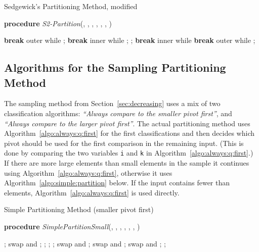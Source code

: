\documentclass[prodmode,acmtalg]{acmsmall}
\begin{document}
\begin{algorithm}
    \caption{Sedgewick's Partitioning Method, modified}\samepage\label{algo:sedgewick:partition:modified}
    \textbf{procedure} \textit{S2-Partition}(,
		, , ,
		, , )
    \begin{algorithmic}[1]
		  \State 
                  \State 
                  \If{}
                  \State \textbf{break} outer while
                  \EndIf
                  \If{} 
                \State ;
                 \ElsIf{}
                 \State \textbf{break} inner while
                 \EndIf
		 \State ;
		 \EndWhile
                 \State 
                 \If{}
                 \State ;
                 \ElsIf{} 
                 \State \textbf{break} inner while
                 \EndIf
                 \If{}
                 \State \textbf{break} outer while
                 \EndIf
		 \State ;
		 \EndWhile
                 \State 
		 \State 
		 \State 
		 \EndWhile
                 \State 
		 \State 
            \end{algorithmic}
            \end{algorithm}

\subsection{Algorithms for the Sampling Partitioning Method}\label{app:sec:our:algorithms}

The sampling method  from Section~\ref{sec:decreasing} uses a mix of two
classification algorithms: \emph{``Always compare to the smaller pivot first''},
and \emph{``Always compare to the larger pivot first''}.  
The actual partitioning method uses
Algorithm~\ref{algo:always:q:first} for the first 
classifications and then decides which pivot should be used for
the first comparison in the remaining input. (This is done by comparing the two variables \texttt{i} and
\texttt{k} in Algorithm~\ref{algo:always:q:first}.) If there are more large
elements than small elements in the sample it continues using
Algorithm~\ref{algo:always:q:first}, otherwise it uses
Algorithm~\ref{algo:simple:partition} below. If the input contains fewer than  elements, 
Algorithm~\ref{algo:always:q:first} is used directly.


\begin{algorithm}
    \caption{Simple Partitioning Method (smaller pivot first)}\samepage\label{algo:simple:partition}
		\textbf{procedure} \textit{SimplePartitionSmall}(,
		, , ,
		, , )
                \begin{algorithmic}[1]
		\State ;
                \While{}
                \If{}
		\State swap  and ;
		\State ;
		\State ;
		\Else
                \If{}
		\State ;
		\Else
		\State swap  and 
		\State ;
		\EndIf
                \EndIf
                \EndWhile
		\State swap  and ;
		\State swap  and ;
		\State ;
            \end{algorithmic}
    \end{algorithm}
\end{document}
